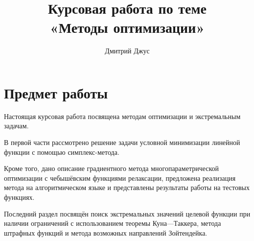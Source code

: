 \documentclass{article}
\theoremstyle{ruthm}
\numberwithin{thm}{section}
\theoremstyle{rurem}
\theoremstyle{rudfn}
\numberwithin{equation}{section}
\begin{document}
\author{Дмитрий Джус}
\title{Курсовая работа по теме \\
  \Huge{«Методы оптимизации»}}
\pretitle{\begin{center}\LARGE}
\posttitle{\par\end{center}\vskip 3pc}
\date{}
\maketitle
\thispagestyle{empty}

\clearpage
\tableofcontents

\clearpage
\listoffigures

\clearpage
\section{Предмет работы}

Настоящая курсовая работа посвящена методам оптимизации и
экстремальным задачам.

В первой части рассмотрено решение задачи условной минимизации
линейной функции с помощью симплекс-метода.

Кроме того, дано описание градиентного метода многопараметрической
оптимизации с чебышёвским функциями релаксации, предложена реализация
метода на алгоритмическом языке и представлены результаты работы на
тестовых функциях.

Последний раздел посвящён поиск экстремальных значений целевой функции
при наличии ограничений с использованием теоремы Куна—Таккера, метода
штрафных функций и метода возможных направлений Зойтендейка.

\clearpage


\clearpage


\clearpage


\clearpage


\clearpage
\appendix


\end{document}
